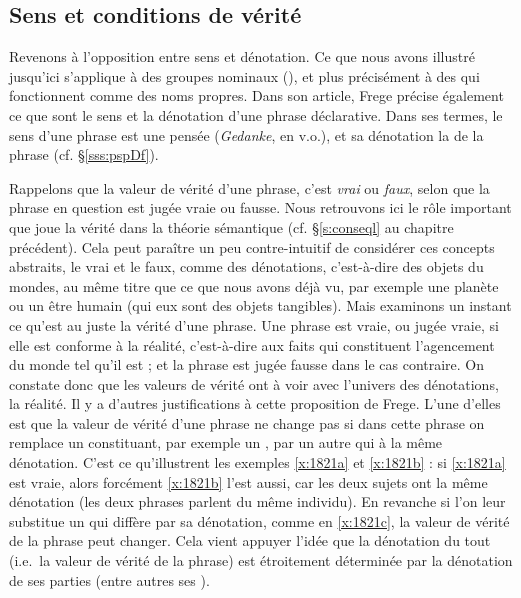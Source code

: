 \subsection{Sens et conditions de vérité}

Revenons à l'opposition entre sens et dénotation. Ce que nous avons
illustré jusqu'ici s'applique à des groupes nominaux (\GN), et plus
précisément à des {\GN} qui fonctionnent comme des noms propres. 
 Dans son article, Frege
précise également ce que sont le sens et la dénotation d'une phrase
déclarative. Dans ses termes, le sens d'une phrase est une pensée
(\emph{Gedanke}, en v.o.), et sa 
dénotation la  de la phrase (cf. \S\ref{sss:pspDf}).  

Rappelons que la valeur de vérité d'une phrase, c'est %
\emph{vrai} ou
\emph{faux}, selon que la phrase en question est jugée vraie ou
fausse.  Nous retrouvons ici le rôle important que joue la vérité dans
la théorie sémantique (cf. \S\ref{s:conseql} au chapitre précédent).
Cela peut paraître un peu contre-intuitif de considérer ces concepts
abstraits, le vrai et le faux, comme des dénotations, c'est-à-dire des
objets du mondes, au même titre que ce que nous avons déjà vu, par exemple
une planète ou un être humain (qui eux sont des objets tangibles).
Mais examinons un instant ce qu'est au juste la vérité d'une phrase.
Une phrase est vraie, ou jugée vraie, si elle est conforme à la
réalité, c'est-à-dire aux faits qui constituent l'agencement du monde
tel qu'il est ; et la phrase est jugée fausse dans le cas contraire.
On constate donc que les valeurs de vérité ont à voir avec l'univers
des dénotations, la réalité.  Il y a d'autres justifications à cette
proposition de Frege.  L'une d'elles est que la  valeur de vérité d'une 
phrase ne change pas si dans cette phrase on  remplace un constituant,
par exemple un 
\GN, par un autre qui à la même dénotation.  
\label{leibniz}
C'est ce qu'illustrent les
exemples \ref{x:1821a} et \ref{x:1821b} : si \ref{x:1821a} est
vraie, alors forcément \ref{x:1821b} l'est aussi, car les deux {\GN}
sujets ont la même dénotation (les deux phrases parlent du même
individu).  En revanche si l'on leur substitue un 
{\GN} qui diffère par sa dénotation, comme en \ref{x:1821c}, la
valeur de vérité de la phrase peut changer.  Cela vient appuyer l'idée
que la dénotation du tout (i.e.\ la valeur de vérité de la phrase) est
étroitement déterminée par la dénotation de ses parties (entre autres
ses \GN).  


